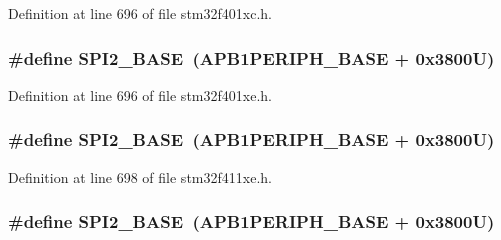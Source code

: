Definition at line 696 of file stm32f401xc.\+h.

\subsubsection[{\texorpdfstring{S\+P\+I2\+\_\+\+B\+A\+SE}{SPI2_BASE}}]{\setlength{\rightskip}{0pt plus 5cm}\#define S\+P\+I2\+\_\+\+B\+A\+SE~({\bf A\+P\+B1\+P\+E\+R\+I\+P\+H\+\_\+\+B\+A\+SE} + 0x3800\+U)}\hypertarget{group___peripheral__registers__structures_gac3e357b4c25106ed375fb1affab6bb86}{}\label{group___peripheral__registers__structures_gac3e357b4c25106ed375fb1affab6bb86}


Definition at line 696 of file stm32f401xe.\+h.

\subsubsection[{\texorpdfstring{S\+P\+I2\+\_\+\+B\+A\+SE}{SPI2_BASE}}]{\setlength{\rightskip}{0pt plus 5cm}\#define S\+P\+I2\+\_\+\+B\+A\+SE~({\bf A\+P\+B1\+P\+E\+R\+I\+P\+H\+\_\+\+B\+A\+SE} + 0x3800\+U)}\hypertarget{group___peripheral__registers__structures_gac3e357b4c25106ed375fb1affab6bb86}{}\label{group___peripheral__registers__structures_gac3e357b4c25106ed375fb1affab6bb86}


Definition at line 698 of file stm32f411xe.\+h.

\subsubsection[{\texorpdfstring{S\+P\+I2\+\_\+\+B\+A\+SE}{SPI2_BASE}}]{\setlength{\rightskip}{0pt plus 5cm}\#define S\+P\+I2\+\_\+\+B\+A\+SE~({\bf A\+P\+B1\+P\+E\+R\+I\+P\+H\+\_\+\+B\+A\+SE} + 0x3800\+U)}\hypertarget{group___peripheral__registers__structures_gac3e357b4c25106ed375fb1affab6bb86}{}\label{group___peripheral__registers__structures_gac3e357b4c25106ed375fb1affab6bb86}


